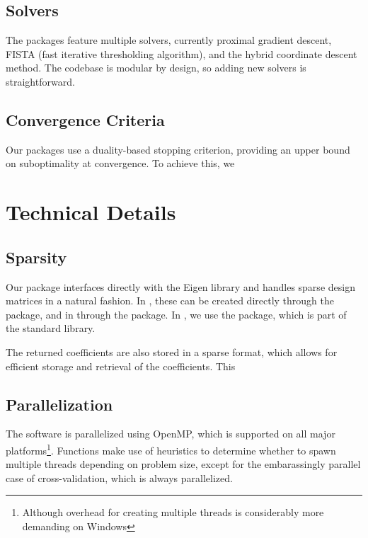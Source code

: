 \documentclass[article]{jss}
\begin{document}
\subsection{Solvers}

The packages feature multiple solvers, currently proximal gradient descent,
FISTA (fast iterative thresholding algorithm), and the hybrid
coordinate descent method. The codebase is modular by design, so
adding new solvers is straightforward.

\subsection{Convergence Criteria}

Our packages use a duality-based stopping criterion, providing an upper
bound on suboptimality at convergence. To achieve this, we

\section{Technical Details}

\subsection{Sparsity}

Our package interfaces directly with the Eigen library and handles
sparse design matrices in a natural fashion. In , these
can be created directly through the  package, and in
 through the  package. In
, we use the  package, which is
part of the standard library.

The returned coefficients are also stored in a sparse format, which
allows for efficient storage and retrieval of the coefficients. This

\subsection{Parallelization}

The software is parallelized using OpenMP, which is supported
on all major platforms\footnote{Although overhead for creating
  multiple threads is considerably more demanding on Windows}.
Functions make use of heuristics to determine whether to
spawn multiple threads depending on problem size, except for
the embarassingly parallel case of cross-validation, which is always
parallelized.
\end{document}
